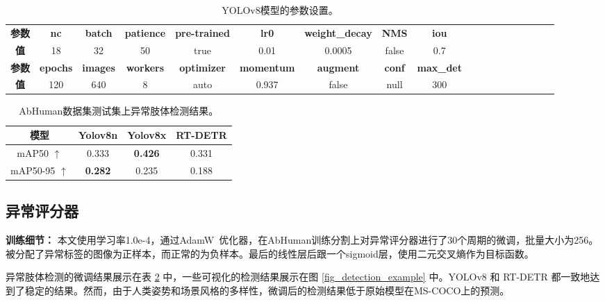 \begin{table}[h]
\footnotesize
    \centering
    \caption{YOLOv8模型的参数设置。}
    \begin{tabular}{c|ccccccccc|cccccccc}
    \hline
    \textbf{参数} & \textbf{nc} & \textbf{batch} & \textbf{patience} & \textbf{pre-trained} & \textbf{lr0} & \textbf{weight\_decay} & \textbf{NMS} & \textbf{iou} \\
     \textbf{值} & 18 & 32 & 50 & true & 0.01 & 0.0005 & false &0.7  \\
     \hline
     \textbf{参数} &\textbf{epochs} & \textbf{images} & \textbf{workers} & \textbf{optimizer} & \textbf{momentum} & \textbf{augment} & \textbf{conf} & \textbf{max\_det} \\
      \textbf{值} & 120 & 640 & 8 & auto & 0.937 & false & null & 300 \\
    \hline
    \end{tabular}
    \label{tab_detection_para}
\end{table}

\begin{table}[h]
  \centering
  \caption{AbHuman数据集测试集上异常肢体检测结果。}
    \begin{tabular}{cccc}
    \toprule
    模型 & Yolov8n & Yolov8x & RT-DETR \\
    \midrule
    mAP50 $\uparrow$ & 0.333 & \textbf{0.426} & 0.331 \\
    mAP50-95 $\uparrow$ & \textbf{0.282}  & 0.235  & 0.188 \\
    \bottomrule
    \end{tabular}%
  \label{tab_detection_res}%
\end{table}%

\subsection{异常评分器}


\textbf{训练细节：} 本文使用学习率1.0e-4，通过AdamW~\cite{loshchilov2017decoupled}优化器，在AbHuman训练分割上对异常评分器进行了30个周期的微调，批量大小为256。被分配了异常标签的图像为正样本，而正常的为负样本。最后的线性层后跟一个sigmoid层，使用二元交叉熵作为目标函数。

异常肢体检测的微调结果展示在表 \ref{tab_detection_res} 中，一些可视化的检测结果展示在图 \ref{fig_detection_example} 中。YOLOv8 \cite{yolo_redmon2016you} 和 RT-DETR \cite{lv2023detrs} 都一致地达到了稳定的结果。然而，由于人类姿势和场景风格的多样性，微调后的检测结果低于原始模型在MS-COCO\cite{MSCOCO_lin2014microsoft}上的预测。

